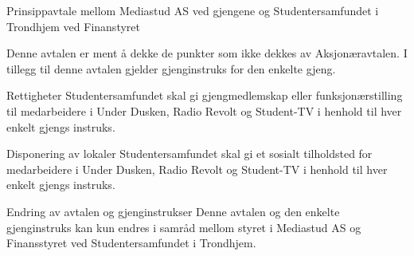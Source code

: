 
\begin{instruks}{Prinsippavtale mellom Mediastud AS ved gjengene og Studentersamfundet i Trondhjem ved 
Finanstyret  }{}{}

        Denne avtalen er ment å dekke de punkter som ikke dekkes av Aksjonæravtalen. I tillegg til denne 
avtalen gjelder gjenginstruks for den enkelte gjeng.

    \begin{instruksledd}{Rettigheter}
	Studentersamfundet skal gi gjengmedlemskap eller funksjonærstilling til medarbeidere i Under Dusken, 
	Radio Revolt og Student-TV i henhold til hver enkelt gjengs instruks.      
    \end{instruksledd}

    \begin{instruksledd}{Disponering av lokaler}
	Studentersamfundet skal gi et sosialt tilholdsted for medarbeidere i Under Dusken, Radio Revolt og 
	Student-TV i henhold til hver enkelt gjengs instruks.
    \end{instruksledd}        

    \begin{instruksledd}{Endring av avtalen og gjenginstrukser}
        Denne avtalen og den enkelte gjenginstruks kan kun endres i samråd mellom styret i Mediastud AS og 
	Finansstyret ved Studentersamfundet i Trondhjem.
    \end{instruksledd}


\end{instruks}



